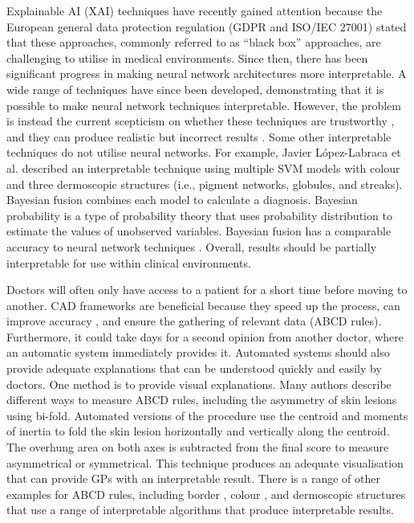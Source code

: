 Explainable AI (XAI) techniques have recently gained attention because the European general data protection regulation (GDPR and ISO/IEC 27001) stated that these approaches, commonly referred to as ``black box'' approaches, are challenging to utilise in medical environments. Since then, there has been significant progress in making neural network architectures more interpretable. A wide range of techniques \cite{Fuji2019,  Selvaraju2016, Ribeiro2016} have since been developed, demonstrating that it is possible to make neural network techniques interpretable. However, the problem is instead the current scepticism on whether these techniques are trustworthy \cite{Tjoa2019, Samek2019a}, and they can produce realistic but incorrect results \cite{Ghorbani2019}. Some other interpretable techniques do not utilise neural networks. For example, Javier López-Labraca et al. \cite{Lopez-Labraca2018} described an interpretable technique using multiple SVM models with colour and three dermoscopic structures (i.e., pigment networks, globules, and streaks). Bayesian fusion combines each model to calculate a diagnosis. Bayesian probability is a type of probability theory that uses probability distribution to estimate the values of unobserved variables. Bayesian fusion has a comparable accuracy to neural network techniques \cite{Takruri2017}. Overall, results should be partially interpretable for use within clinical environments.

Doctors will often only have access to a patient for a short time before moving to another. CAD frameworks are beneficial because they speed up the process, can improve accuracy \cite{Dick2019}, and ensure the gathering of relevant data (ABCD rules). Furthermore, it could take days for a second opinion from another doctor, where an automatic system immediately provides it. Automated systems should also provide adequate explanations that can be understood quickly and easily by doctors\cite{Lipton2018}. One method is to provide visual explanations. Many authors \cite{Zaqout2016, Kasmi2016, Ali2020a} describe different ways to measure ABCD rules, including the asymmetry of skin lesions using bi-fold. Automated versions of the procedure use the centroid and moments of inertia to fold the skin lesion horizontally and vertically along the centroid. The overhung area on both axes is subtracted from the final score to measure asymmetrical or symmetrical. This technique produces an adequate visualisation that can provide GPs with an interpretable result. There is a range of other examples for ABCD rules, including border \cite{Kasmi2016, Zaqout2016, Ali2020b}, colour \cite{She2007, Tenenhaus2010, Kasmi2016}, and dermoscopic structures \cite{Lopez-Labraca2018} that use a range of interpretable algorithms that produce interpretable results.


